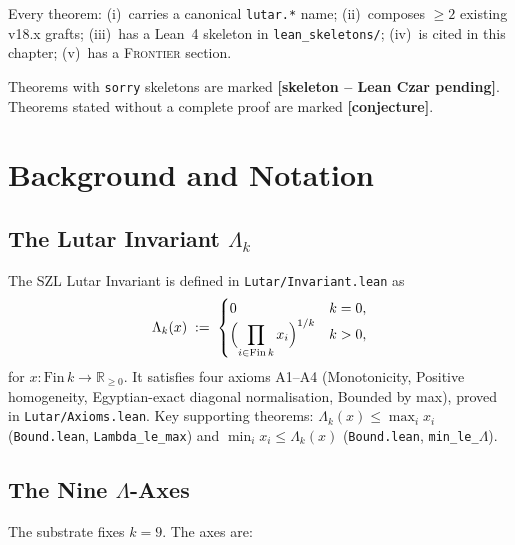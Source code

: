 \noindent
Every theorem: (i)~carries a canonical \texttt{lutar.*} name;
(ii)~composes $\geq 2$ existing v18.x grafts; (iii)~has a
Lean~4 skeleton in \texttt{lean\_skeletons/}; (iv)~is cited in this
chapter; (v)~has a \textsc{Frontier} section.

Theorems with \texttt{sorry} skeletons are marked
\textbf{[skeleton -- Lean Czar pending]}.
Theorems stated without a complete proof are marked
\textbf{[conjecture]}.

\section{Background and Notation}
\label{sec:notation-ch06}

\subsection*{The Lutar Invariant $\Lambda_k$}

The SZL Lutar Invariant is defined in
\texttt{Lutar/Invariant.lean} as
\[
  \Lambda_k(x)
  \;:=\;
  \begin{cases}
    0 & k = 0,\\
    \displaystyle
    \Bigl(\prod_{i \in \mathrm{Fin}\,k} x_i\Bigr)^{1/k}
    & k > 0,
  \end{cases}
\]
for $x : \mathrm{Fin}\,k \to \mathbb{R}_{\geq 0}$.
It satisfies four axioms A1--A4 (Monotonicity, Positive homogeneity,
Egyptian-exact diagonal normalisation, Bounded by max), proved in
\texttt{Lutar/Axioms.lean}.
Key supporting theorems: $\Lambda_k(x) \leq \max_i x_i$
(\texttt{Bound.lean}, \texttt{Lambda\_le\_max}) and
$\min_i x_i \leq \Lambda_k(x)$ (\texttt{Bound.lean},
\texttt{min\_le\_\(\Lambda\)}).

\subsection*{The Nine $\Lambda$-Axes}

The substrate fixes $k = 9$.  The axes are:

